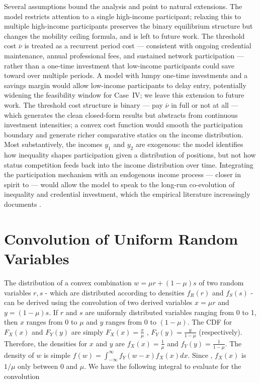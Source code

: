 \documentclass[
    oneside,
    fontsize=10pt,leqno]{article}
\begin{document}
Several assumptions bound the analysis and point to natural
extensions. The model restricts attention to a single high-income participant;
relaxing this to multiple high-income participants preserves the
binary equilibrium structure but changes the mobility ceiling
formula, and is left to future work.
The threshold cost $\overline{\nu}$ is treated as a recurrent
period cost --- consistent with ongoing credential maintenance,
annual professional fees, and sustained network participation ---
rather than a one-time investment that low-income participants
could save toward over multiple periods. A model with lumpy
one-time investments and a savings margin would allow low-income
participants to delay entry, potentially widening the feasibility
window for Case~IV; we leave this extension to future work.
The threshold cost structure is binary --- pay $\overline{\nu}$ in
full or not at all --- which generates the clean closed-form results
but abstracts from continuous investment intensities; a convex cost
function would smooth the participation boundary and generate richer
comparative statics on the income distribution. Most substantively,
the incomes $y_1$ and $y_2$ are exogenous: the model identifies how
inequality shapes participation given a distribution of positions,
but not how status competition feeds back into the income distribution
over time. Integrating the participation mechanism with an endogenous
income process --- closer in spirit to \citet{ColeMailaithPostlewaite1992}
--- would allow the model to speak to the long-run co-evolution of
inequality and credential investment, which the empirical literature
increasingly documents \citep{MijsParadox2019,MijsMeritocracy2020}.



\appendix
\section{Convolution of Uniform Random Variables} \label{sec:appendix_theoretical_1}

The distribution of a convex combination $w=\mu r+(1-\mu)s$ of two
random variables $r,s$ - which are distributed according to densities
$f_{R}(r)$ and $f_{S}(s)$ - can be derived using the convolution
of two derived variables $x=\mu r$ and $y=(1-\mu)s$. If $r$ and
$s$ are uniformly distributed variables ranging from 0 to 1, then
$x$ ranges from 0 to $\mu$ and $y$ ranges from $0$ to $(1-\mu)$.
The CDF for $F_{X}(x)$ and $F_{Y}(y)$ are simply $F_{X}(x)=\frac{x}{\mu}$
, $F_{Y}(y)=\frac{y}{1-\mu}$ (respectively). Therefore, the densities
for $x$ and $y$ are $f_{X}(x)=\frac{1}{\mu}$ and $f_{Y}(y)=\frac{1}{1-\mu}$.
The density of $w$ is simple $f(w)=\int_{-\infty}^{\infty}f_{Y}(w-x)f_{X}(x)dx$.
Since , $f_{X}(x)$ is $1/\mu$ only between $0$ and $\mu$. We have
the following integral to evaluate for the convolution
\end{document}
